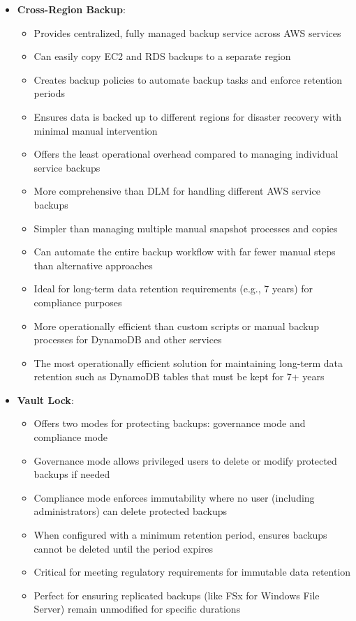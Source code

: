 \documentclass[11pt,a4paper]{report}
\begin{document}
\begin{itemize}
  \item \textbf{Cross-Region Backup}:
\begin{itemize}
  \item Provides centralized, fully managed backup service across AWS services
  \item Can easily copy EC2 and RDS backups to a separate region
  \item Creates backup policies to automate backup tasks and enforce retention periods
  \item Ensures data is backed up to different regions for disaster recovery with minimal manual intervention
  \item Offers the least operational overhead compared to managing individual service backups
  \item More comprehensive than DLM for handling different AWS service backups
  \item Simpler than managing multiple manual snapshot processes and copies
  \item Can automate the entire backup workflow with far fewer manual steps than alternative approaches
  \item Ideal for long-term data retention requirements (e.g., 7 years) for compliance purposes
  \item More operationally efficient than custom scripts or manual backup processes for DynamoDB and other services
  \item The most operationally efficient solution for maintaining long-term data retention such as DynamoDB tables that must be kept for 7+ years
\end{itemize}
  \item \textbf{Vault Lock}:
\begin{itemize}
  \item Offers two modes for protecting backups: governance mode and compliance mode
  \item Governance mode allows privileged users to delete or modify protected backups if needed
  \item Compliance mode enforces immutability where no user (including administrators) can delete protected backups
  \item When configured with a minimum retention period, ensures backups cannot be deleted until the period expires
  \item Critical for meeting regulatory requirements for immutable data retention
  \item Perfect for ensuring replicated backups (like FSx for Windows File Server) remain unmodified for specific durations

\end{itemize}
\end{itemize}
\end{document}
